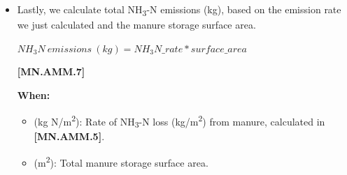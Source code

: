 \begin{refsection}
\begin{itemize}
    \begin{center}
\(NH_3N\ emission\ rate\ (kg\ N/m^2)= \frac{(TAN * c * y)}{(STORAGE\_RESISTANCE * M * Q)} \)
    \end{center}
        \vspace{0.5cm} 
    
            {\raggedleft \textbf{[MN.AMM.5]}\par}
            \vspace{0.5cm}

\textbf{When:}
    \begin{itemize}
        \item TAN (kg): Mass of ammoniacal N in stored manure
        \item c: time conversion constant (86400 s per d)
        \item y: manure density, set to 990 kg/m\textsuperscript{3} 
        \item STORAGE\_RESISTANCE: A constant value representing the sum of resistance of NH\textsubscript{3} transfer from solution to manure surface, and from manure surface to atmosphere, set at 23.1 s/m.
        \item M (kg): Total mass of stored manure
        \item Q: Equilibrium coefficient calculated in \textbf{[MN.AMM.3]}

    \end{itemize}

        \item Lastly, we calculate total NH\textsubscript{3}-N emissions (kg), based on the emission rate we just calculated and the manure storage surface area.
         \vspace{0.2cm}

    \begin{center}
\(NH_3N\ emissions\ (kg) = NH_3N\_rate * surface\_area\)
    \end{center}
        \vspace{0.5cm} 
    
            {\raggedleft \textbf{[MN.AMM.7]}\par}
            \vspace{0.5cm}

\textbf{When:}
\begin{itemize}
    \item {} (kg N/m\textsuperscript{2}): Rate of NH\textsubscript{3}-N loss (kg/m\textsuperscript{2}) from manure, calculated in \textbf{[MN.AMM.5]}.
    \item {} (m\textsuperscript{2}): Total manure storage surface area.
\end{itemize}
        

\end{itemize}
\end{refsection}
